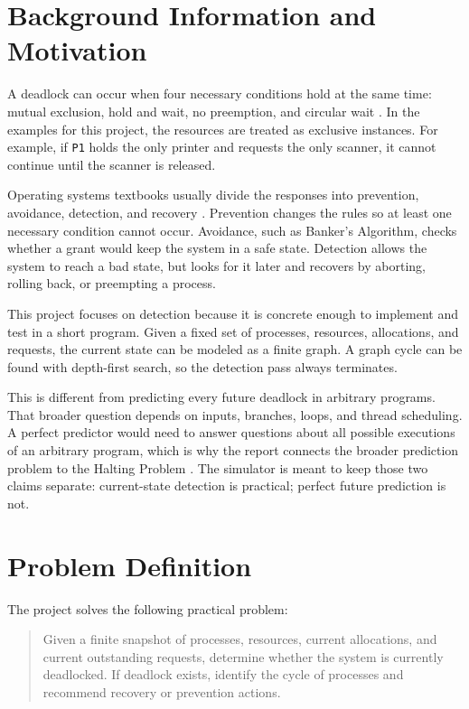 \documentclass[10pt]{article}
\begin{document}
\section{Background Information and Motivation}

A deadlock can occur when four necessary conditions hold at the same time: mutual exclusion, hold and wait, no preemption, and circular wait \cite{osc}. In the examples for this project, the resources are treated as exclusive instances. For example, if \texttt{P1} holds the only printer and requests the only scanner, it cannot continue until the scanner is released.

Operating systems textbooks usually divide the responses into prevention, avoidance, detection, and recovery \cite{tanenbaum}. Prevention changes the rules so at least one necessary condition cannot occur. Avoidance, such as Banker's Algorithm, checks whether a grant would keep the system in a safe state. Detection allows the system to reach a bad state, but looks for it later and recovers by aborting, rolling back, or preempting a process.

This project focuses on detection because it is concrete enough to implement and test in a short program. Given a fixed set of processes, resources, allocations, and requests, the current state can be modeled as a finite graph. A graph cycle can be found with depth-first search, so the detection pass always terminates.

This is different from predicting every future deadlock in arbitrary programs. That broader question depends on inputs, branches, loops, and thread scheduling. A perfect predictor would need to answer questions about all possible executions of an arbitrary program, which is why the report connects the broader prediction problem to the Halting Problem \cite{turing}. The simulator is meant to keep those two claims separate: current-state detection is practical; perfect future prediction is not.

\section{Problem Definition}

The project solves the following practical problem:

\begin{quote}
Given a finite snapshot of processes, resources, current allocations, and current outstanding requests, determine whether the system is currently deadlocked. If deadlock exists, identify the cycle of processes and recommend recovery or prevention actions.
\end{quote}
\end{document}
